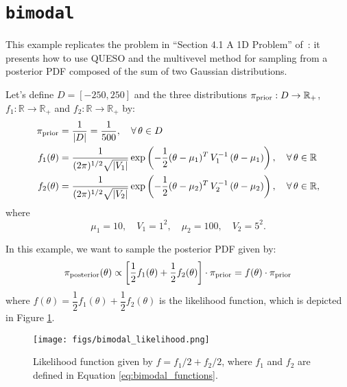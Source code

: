 \section{\texttt{bimodal}}\label{sec:bimodal_bimodal}


This example replicates the problem in ``Section 4.1 A 1D Problem'' of~\cite{CheungPrudencio2012}: it presents how to use QUESO and the multivevel method for sampling from a posterior PDF composed of the sum of two Gaussian distributions. 

Let's define $D=[-250,250]$ and the three distributions $\pi_{\text{prior}}: D \rightarrow \mathbb{R}_+ $, $f_1: \mathbb{R} \rightarrow \mathbb{R}_+ $ and $f_2: \mathbb{R} \rightarrow \mathbb{R}_+$ by:
\begin{equation}
\begin{split}\label{eq:bimodal_functions}
\pi_{\text{prior}} &=  \dfrac{1}{|D|} = \dfrac{1}{500}, \quad \forall \,  \theta \in D \\
f_1(\theta) &= \dfrac{1}{(2\pi)^{1/2} \sqrt{|V_1|}} \exp \left(-\dfrac{1}{2}(\theta - \mu_1)^T \, V_1^{-1} \, (\theta - \mu_1) \right), \quad \forall \,  \theta \in \mathbb{R} \\
f_2(\theta) &= \dfrac{1}{(2\pi)^{1/2} \sqrt{|V_2|}} \exp \left(-\dfrac{1}{2}(\theta - \mu_2)^T \, V_2^{-1} \, (\theta - \mu_2) \right), \quad \forall \, \theta \in \mathbb{R},
\end{split}
\end{equation}
where
\begin{equation*}
\mu_1 = 10, \quad  V_1 = 1^2, \quad \mu_2 = 100, \quad V_2= 5^2.
\end{equation*}

In this example, we want to sample the posterior PDF given by:
\begin{equation}
\pi_{\text{posterior}}(\theta)  \propto \left[\dfrac{1}{2} f_1(\theta) + \dfrac{1}{2} f_2(\theta) \right] \cdot \pi_{\text{prior}} = f(\theta) \cdot \pi_{\text{prior}}
\end{equation}
where $f(\theta)= \dfrac{1}{2} f_1(\theta) + \dfrac{1}{2} f_2(\theta)$ is the likelihood function, which is depicted in Figure \ref{fig:bimodal:likelihood}.

\begin{figure}[htpb]
\centering
\texttt{[image: figs/bimodal\_likelihood.png]}
\vspace{-10pt}
\caption{Likelihood function given by $f=f_1/2+ f_2/2$, where $f_1$ and $f_2$ are defined in Equation \eqref{eq:bimodal_functions}.}
\label{fig:bimodal:likelihood}
\end{figure}


